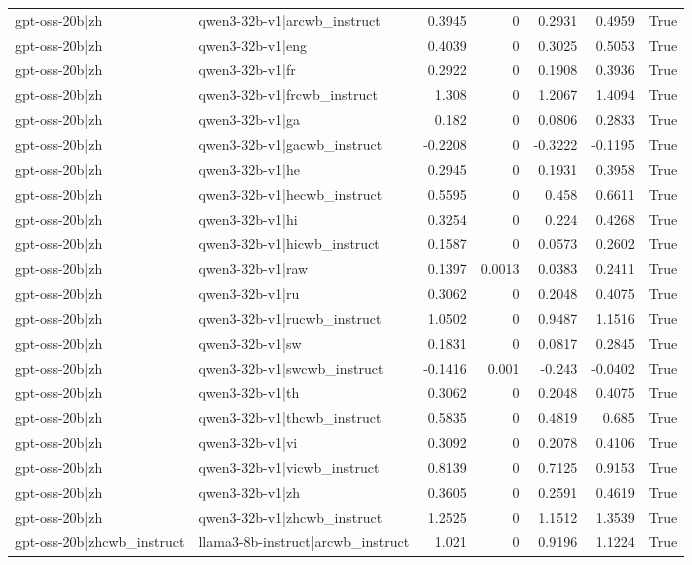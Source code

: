 \begin{table}
\begin{tabular}{l l r r r r l}
gpt-oss-20b|zh & qwen3-32b-v1|arcwb_instruct & 0.3945 & 0 & 0.2931 & 0.4959 & True \\
gpt-oss-20b|zh & qwen3-32b-v1|eng & 0.4039 & 0 & 0.3025 & 0.5053 & True \\
gpt-oss-20b|zh & qwen3-32b-v1|fr & 0.2922 & 0 & 0.1908 & 0.3936 & True \\
gpt-oss-20b|zh & qwen3-32b-v1|frcwb_instruct & 1.308 & 0 & 1.2067 & 1.4094 & True \\
gpt-oss-20b|zh & qwen3-32b-v1|ga & 0.182 & 0 & 0.0806 & 0.2833 & True \\
gpt-oss-20b|zh & qwen3-32b-v1|gacwb_instruct & -0.2208 & 0 & -0.3222 & -0.1195 & True \\
gpt-oss-20b|zh & qwen3-32b-v1|he & 0.2945 & 0 & 0.1931 & 0.3958 & True \\
gpt-oss-20b|zh & qwen3-32b-v1|hecwb_instruct & 0.5595 & 0 & 0.458 & 0.6611 & True \\
gpt-oss-20b|zh & qwen3-32b-v1|hi & 0.3254 & 0 & 0.224 & 0.4268 & True \\
gpt-oss-20b|zh & qwen3-32b-v1|hicwb_instruct & 0.1587 & 0 & 0.0573 & 0.2602 & True \\
gpt-oss-20b|zh & qwen3-32b-v1|raw & 0.1397 & 0.0013 & 0.0383 & 0.2411 & True \\
gpt-oss-20b|zh & qwen3-32b-v1|ru & 0.3062 & 0 & 0.2048 & 0.4075 & True \\
gpt-oss-20b|zh & qwen3-32b-v1|rucwb_instruct & 1.0502 & 0 & 0.9487 & 1.1516 & True \\
gpt-oss-20b|zh & qwen3-32b-v1|sw & 0.1831 & 0 & 0.0817 & 0.2845 & True \\
gpt-oss-20b|zh & qwen3-32b-v1|swcwb_instruct & -0.1416 & 0.001 & -0.243 & -0.0402 & True \\
gpt-oss-20b|zh & qwen3-32b-v1|th & 0.3062 & 0 & 0.2048 & 0.4075 & True \\
gpt-oss-20b|zh & qwen3-32b-v1|thcwb_instruct & 0.5835 & 0 & 0.4819 & 0.685 & True \\
gpt-oss-20b|zh & qwen3-32b-v1|vi & 0.3092 & 0 & 0.2078 & 0.4106 & True \\
gpt-oss-20b|zh & qwen3-32b-v1|vicwb_instruct & 0.8139 & 0 & 0.7125 & 0.9153 & True \\
gpt-oss-20b|zh & qwen3-32b-v1|zh & 0.3605 & 0 & 0.2591 & 0.4619 & True \\
gpt-oss-20b|zh & qwen3-32b-v1|zhcwb_instruct & 1.2525 & 0 & 1.1512 & 1.3539 & True \\
gpt-oss-20b|zhcwb_instruct & llama3-8b-instruct|arcwb_instruct & 1.021 & 0 & 0.9196 & 1.1224 & True \\

\end{tabular}
\end{table}
